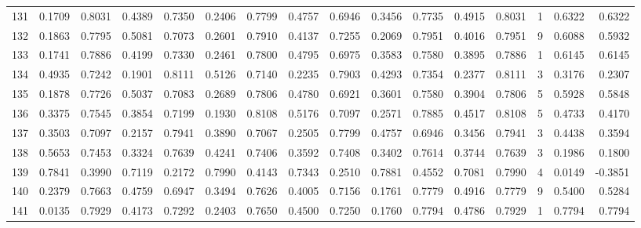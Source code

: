 \begin{tabular}{lrrrrrrrrrrrrrrr}
131 &      0.1709 &  0.8031 &  0.4389 &  0.7350 &  0.2406 &  0.7799 &  0.4757 &  0.6946 &  0.3456 &  0.7735 &   0.4915 &     0.8031 &      1 &                    0.6322 &                     0.6322 \\
132 &      0.1863 &  0.7795 &  0.5081 &  0.7073 &  0.2601 &  0.7910 &  0.4137 &  0.7255 &  0.2069 &  0.7951 &   0.4016 &     0.7951 &      9 &                    0.6088 &                     0.5932 \\
133 &      0.1741 &  0.7886 &  0.4199 &  0.7330 &  0.2461 &  0.7800 &  0.4795 &  0.6975 &  0.3583 &  0.7580 &   0.3895 &     0.7886 &      1 &                    0.6145 &                     0.6145 \\
134 &      0.4935 &  0.7242 &  0.1901 &  0.8111 &  0.5126 &  0.7140 &  0.2235 &  0.7903 &  0.4293 &  0.7354 &   0.2377 &     0.8111 &      3 &                    0.3176 &                     0.2307 \\
135 &      0.1878 &  0.7726 &  0.5037 &  0.7083 &  0.2689 &  0.7806 &  0.4780 &  0.6921 &  0.3601 &  0.7580 &   0.3904 &     0.7806 &      5 &                    0.5928 &                     0.5848 \\
136 &      0.3375 &  0.7545 &  0.3854 &  0.7199 &  0.1930 &  0.8108 &  0.5176 &  0.7097 &  0.2571 &  0.7885 &   0.4517 &     0.8108 &      5 &                    0.4733 &                     0.4170 \\
137 &      0.3503 &  0.7097 &  0.2157 &  0.7941 &  0.3890 &  0.7067 &  0.2505 &  0.7799 &  0.4757 &  0.6946 &   0.3456 &     0.7941 &      3 &                    0.4438 &                     0.3594 \\
138 &      0.5653 &  0.7453 &  0.3324 &  0.7639 &  0.4241 &  0.7406 &  0.3592 &  0.7408 &  0.3402 &  0.7614 &   0.3744 &     0.7639 &      3 &                    0.1986 &                     0.1800 \\
139 &      0.7841 &  0.3990 &  0.7119 &  0.2172 &  0.7990 &  0.4143 &  0.7343 &  0.2510 &  0.7881 &  0.4552 &   0.7081 &     0.7990 &      4 &                    0.0149 &                    -0.3851 \\
140 &      0.2379 &  0.7663 &  0.4759 &  0.6947 &  0.3494 &  0.7626 &  0.4005 &  0.7156 &  0.1761 &  0.7779 &   0.4916 &     0.7779 &      9 &                    0.5400 &                     0.5284 \\
141 &      0.0135 &  0.7929 &  0.4173 &  0.7292 &  0.2403 &  0.7650 &  0.4500 &  0.7250 &  0.1760 &  0.7794 &   0.4786 &     0.7929 &      1 &                    0.7794 &                     0.7794 \\

\end{tabular}
